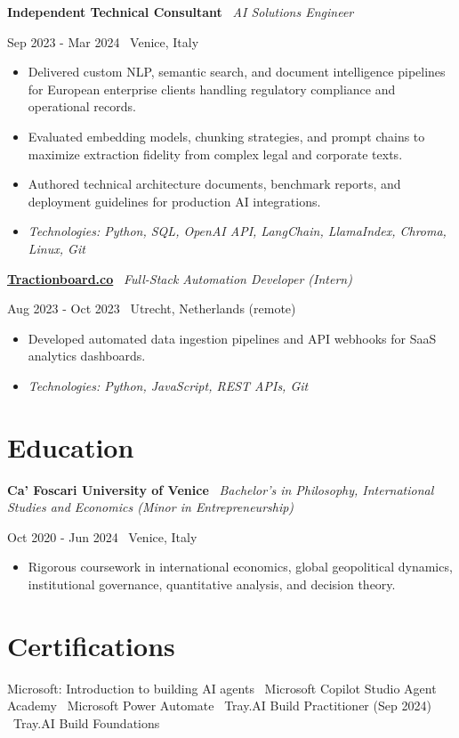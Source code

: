 \documentclass[a4paper,10pt]{article}
\newcommand{\role}[4]{%
  \vspace{2pt}\noindent
  \begin{minipage}[t]{0.70\textwidth}\raggedright\textbf{#1} \textbullet\ \textit{#3}\end{minipage}%
  \hfill
  \begin{minipage}[t]{0.28\textwidth}\raggedleft\footnotesize\color{gray}#2 \textbullet\ #4\end{minipage}%
  \vspace{1pt}%
}
\begin{document}
\role{Independent Technical Consultant}{Sep 2023 - Mar 2024}{AI Solutions Engineer}{Venice, Italy}
\begin{itemize}
  \item Delivered custom NLP, semantic search, and document intelligence pipelines for European enterprise clients handling regulatory compliance and operational records.
  \item Evaluated embedding models, chunking strategies, and prompt chains to maximize extraction fidelity from complex legal and corporate texts.
  \item Authored technical architecture documents, benchmark reports, and deployment guidelines for production AI integrations.
  \item \textit{Technologies: Python, SQL, OpenAI API, LangChain, LlamaIndex, Chroma, Linux, Git}
\end{itemize}

\role{\href{https://tractionboard.co}{Tractionboard.co}}{Aug 2023 - Oct 2023}{Full-Stack Automation Developer (Intern)}{Utrecht, Netherlands (remote)}
\begin{itemize}
  \item Developed automated data ingestion pipelines and API webhooks for SaaS analytics dashboards.
  \item \textit{Technologies: Python, JavaScript, REST APIs, Git}
\end{itemize}

\section{Education}
\role{Ca' Foscari University of Venice}{Oct 2020 - Jun 2024}{Bachelor's in Philosophy, International Studies and Economics (Minor in Entrepreneurship)}{Venice, Italy}
\begin{itemize}
  \item Rigorous coursework in international economics, global geopolitical dynamics, institutional governance, quantitative analysis, and decision theory.
\end{itemize}

\section{Certifications}
Microsoft: Introduction to building AI agents \textbullet\ Microsoft Copilot Studio Agent Academy \textbullet\ Microsoft Power Automate \textbullet\ Tray.AI Build Practitioner (Sep 2024) \textbullet\ Tray.AI Build Foundations
\end{document}
